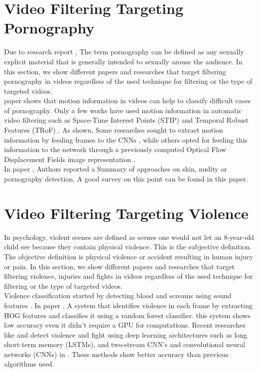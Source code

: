 \documentclass[runningheads]{llncs}
\begin{document}
\section{Video Filtering Targeting Pornography}
Due to research report \cite{quadara2017effects}, The term pornography can be defined as any sexually explicit material that is generally intended to sexually arouse the audience. In this section, we show different papers and researches that target filtering pornography in videos regardless of the used technique for filtering or the type of targeted videos.\\

paper \cite{perez2017video} shows that motion information in videos can help to classify difficult cases of pornography. Only a few works have used motion information in automatic video filtering such as Space-Time Interest Points (STIP)\cite{laptev2005space} and Temporal Robust Features (TRoF) \cite{moreira2016pornography}. As shown, Some researches sought to extract motion information by feeding frames to the CNNs \cite{le2011learning}, while others opted for feeding this information to the network through a previously computed Optical Flow Displacement Fields image representation \cite{simonyan2014two}.\\

In paper \cite{perez2017video}, Authors reported a Summary of approaches on skin, nudity or pornography detection. A good survey on this point can be found in this paper.\\

\section{Video Filtering Targeting Violence}
In psychology, violent scenes are defined as scenes one would not let an 8-year-old child see because they contain physical violence. This is the subjective definition. The objective definition is physical violence or accident resulting in human injury or pain. In this section, we show different papers and researches that target filtering violence, injuries and fights in videos regardless of the used technique for filtering or the type of targeted videos.\\

Violence classification started by detecting blood and screams using sound features \cite{giannakopoulos2006violence}. In paper \cite{das2019violence}, A system that identifies violence in each frame by extracting HOG features and classifies it using a random forest classifier.
this system shows low accuracy even it didn't require a GPU for computations.
Recent researches like  \cite{simonyan2014two} and \cite{sakthivinayagam2019violence} detect violence and fight using deep learning architectures such as long short-term memory (LSTMs), and two-stream CNN's \cite{simonyan2014two} and convolutional neural networks (CNNs) in \cite{sakthivinayagam2019violence}. These methods show better accuracy than previous algorithms used.\\
\end{document}
